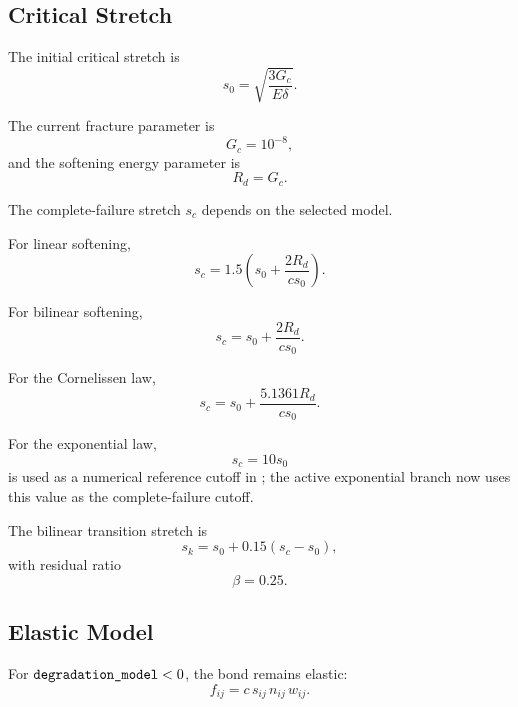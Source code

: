 \documentclass[11pt]{article}
\newcommand{\code}[1]{\texttt{\detokenize{#1}}}
\begin{document}
\subsection{Critical Stretch}

The initial critical stretch is
\begin{equation}
    s_0 =
    \sqrt{
        \frac{3G_c}{E\delta}
    }.
\end{equation}

The current fracture parameter is
\begin{equation}
    G_c = 10^{-8},
\end{equation}
and the softening energy parameter is
\begin{equation}
    R_d = G_c.
\end{equation}

The complete-failure stretch \(s_c\) depends on the selected model.

For linear softening,
\begin{equation}
    s_c =
    1.5
    \left(
        s_0+
        \frac{2R_d}{cs_0}
    \right).
\end{equation}

For bilinear softening,
\begin{equation}
    s_c =
    s_0+
    \frac{2R_d}{cs_0}.
\end{equation}

For the Cornelissen law,
\begin{equation}
    s_c =
    s_0+
    \frac{5.1361R_d}{cs_0}.
\end{equation}

For the exponential law,
\begin{equation}
    s_c = 10s_0
\end{equation}
is used as a numerical reference cutoff in \code{main.cpp}; the active
exponential branch now uses this value as the complete-failure cutoff.

The bilinear transition stretch is
\begin{equation}
    s_k =
    s_0 + 0.15(s_c-s_0),
\end{equation}
with residual ratio
\begin{equation}
    \beta = 0.25 .
\end{equation}

\subsection{Elastic Model}

For \(\code{degradation_model}<0\), the bond remains elastic:
\begin{equation}
    f_{ij}
    =
    c\,s_{ij}\,n_{ij}\,w_{ij}.
\end{equation}
\end{document}
